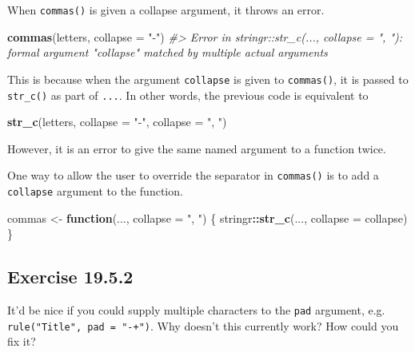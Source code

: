 \documentclass[]{book}
\newenvironment{Shaded}{\begin{snugshade}}{\end{snugshade}}
\newcommand{\CommentTok}[1]{\textcolor[rgb]{0.56,0.35,0.01}{\textit{#1}}}
\newcommand{\ControlFlowTok}[1]{\textcolor[rgb]{0.13,0.29,0.53}{\textbf{#1}}}
\newcommand{\DataTypeTok}[1]{\textcolor[rgb]{0.13,0.29,0.53}{#1}}
\newcommand{\KeywordTok}[1]{\textcolor[rgb]{0.13,0.29,0.53}{\textbf{#1}}}
\newcommand{\NormalTok}[1]{#1}
\newcommand{\OperatorTok}[1]{\textcolor[rgb]{0.81,0.36,0.00}{\textbf{#1}}}
\newcommand{\StringTok}[1]{\textcolor[rgb]{0.31,0.60,0.02}{#1}}
\theoremstyle{plain}
\theoremstyle{remark}
\begin{document}
When \texttt{commas()} is given a collapse argument, it throws an error.

\begin{Shaded}
\begin{Highlighting}[]
\KeywordTok{commas}\NormalTok{(letters, }\DataTypeTok{collapse =} \StringTok{"-"}\NormalTok{)}
\CommentTok{#> Error in stringr::str_c(..., collapse = ", "): formal argument "collapse" matched by multiple actual arguments}
\end{Highlighting}
\end{Shaded}

This is because when the argument \texttt{collapse} is given to
\texttt{commas()}, it is passed to \texttt{str\_c()} as part of
\texttt{...}. In other words, the previous code is equivalent to

\begin{Shaded}
\begin{Highlighting}[]
\KeywordTok{str_c}\NormalTok{(letters, }\DataTypeTok{collapse =} \StringTok{"-"}\NormalTok{, }\DataTypeTok{collapse =} \StringTok{", "}\NormalTok{)}
\end{Highlighting}
\end{Shaded}

However, it is an error to give the same named argument to a function
twice.

One way to allow the user to override the separator in \texttt{commas()}
is to add a \texttt{collapse} argument to the function.

\begin{Shaded}
\begin{Highlighting}[]
\NormalTok{commas <-}\StringTok{ }\ControlFlowTok{function}\NormalTok{(..., }\DataTypeTok{collapse =} \StringTok{", "}\NormalTok{) \{}
\NormalTok{  stringr}\OperatorTok{::}\KeywordTok{str_c}\NormalTok{(..., }\DataTypeTok{collapse =}\NormalTok{ collapse)}
\NormalTok{\}}
\end{Highlighting}
\end{Shaded}

\hypertarget{exercise-19.5.2}{%
\subsection*{\texorpdfstring{Exercise
{19.5.2}}{Exercise 19.5.2}}\label{exercise-19.5.2}}

It'd be nice if you could supply multiple characters to the \texttt{pad}
argument, e.g. \texttt{rule("Title",\ pad\ =\ "-+")}. Why doesn't this
currently work? How could you fix it?
\end{document}
